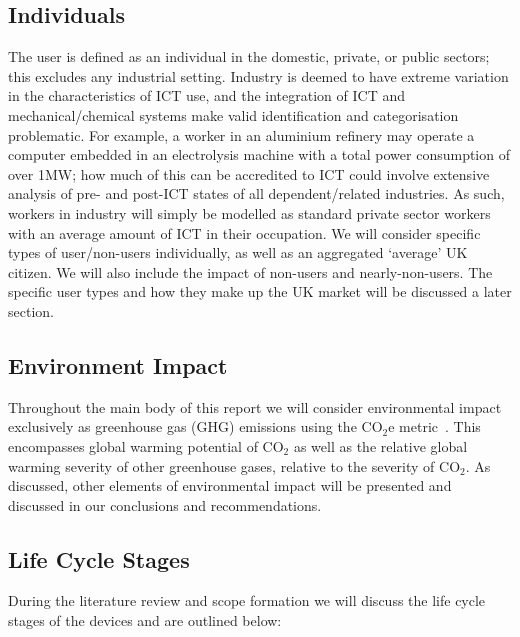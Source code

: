 \documentclass[conference]{IEEEtran}
\begin{document}
\subsection{Individuals}

The user is defined as an individual in the domestic, private, or
public sectors; this excludes any industrial setting. Industry is
deemed to have extreme variation in the characteristics of ICT use,
and the integration of ICT and mechanical/chemical systems make valid
identification and categorisation problematic. For example, a worker
in an aluminium refinery may operate a computer embedded in an
electrolysis machine with a total power consumption of over 1MW; how
much of this can be accredited to ICT could involve extensive analysis
of pre- and post-ICT states of all dependent/related industries. As
such, workers in industry will simply be modelled as standard private
sector workers with an average amount of ICT in their occupation.  We
will consider specific types of user/non-users individually, as well
as an aggregated `average' UK citizen. We will also include the impact
of non-users and nearly-non-users. The specific user types and how
they make up the UK market will be discussed a later section.

\subsection{Environment Impact}

Throughout the main body of this report we will consider environmental
impact exclusively as greenhouse gas (GHG) emissions using the CO$_2$e
metric~\cite{bsi2050:2011,ieaco2em:2014}. This encompasses global
warming potential of CO$_2$ as well as the relative global warming
severity of other greenhouse gases, relative to the severity of
CO$_2$. As discussed, other elements of environmental impact will be
presented and discussed in our conclusions and recommendations.

\subsection{Life Cycle Stages}

During the literature review and scope formation we will discuss the
life cycle stages of the devices and are outlined below:
\end{document}
